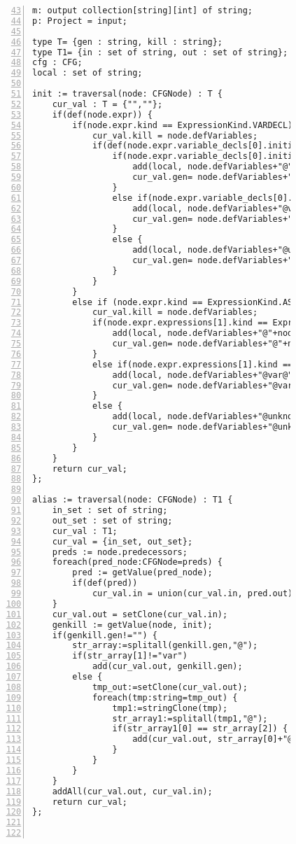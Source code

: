\begin{figure}[ht!]
\begin{lstlisting}[numbers=left, tabsize=4, caption={Local must not alias},label={lst:lmna-code}, firstline = 43, firstnumber = 43, lastline = 91] 
m: output collection[string][int] of string;
p: Project = input;

type T= {gen : string, kill : string};
type T1= {in : set of string, out : set of string};
cfg : CFG;
local : set of string;

init := traversal(node: CFGNode) : T {
	cur_val : T = {"",""};
	if(def(node.expr)) {
		if(node.expr.kind == ExpressionKind.VARDECL) {
			cur_val.kill = node.defVariables;
			if(def(node.expr.variable_decls[0].initializer)) {
				if(node.expr.variable_decls[0].initializer.kind == ExpressionKind.NEW) {
					add(local, node.defVariables+"@"+node.expr.variable_decls[0].initializer.new_type.qualified_name);
					cur_val.gen= node.defVariables+"@"+node.expr.variable_decls[0].initializer.new_type.qualified_name;
				}
				else if(node.expr.variable_decls[0].initializer.kind == ExpressionKind.VARACCESS) {
					add(local, node.defVariables+"@var@"+node.expr.variable_decls[0].initializer.variable);
					cur_val.gen= node.defVariables+"@var@"+node.expr.variable_decls[0].initializer.variable;
				}
				else {
					add(local, node.defVariables+"@unknown");
					cur_val.gen= node.defVariables+"@unknown";
				}
			}
		}
		else if (node.expr.kind == ExpressionKind.ASSIGN) {
			cur_val.kill = node.defVariables;
			if(node.expr.expressions[1].kind == ExpressionKind.NEW) {
				add(local, node.defVariables+"@"+node.expr.expressions[1].new_type.qualified_name);
				cur_val.gen= node.defVariables+"@"+node.expr.expressions[1].new_type.qualified_name;
			}
			else if(node.expr.expressions[1].kind == ExpressionKind.VARACCESS) {
				add(local, node.defVariables+"@var@"+node.expr.expressions[1].variable);
				cur_val.gen= node.defVariables+"@var@"+node.expr.expressions[1].variable;
			}
			else {
				add(local, node.defVariables+"@unknown");
				cur_val.gen= node.defVariables+"@unknown";
			}
		}
	}
	return cur_val;
};

alias := traversal(node: CFGNode) : T1 {
	in_set : set of string;
	out_set : set of string;
	cur_val : T1;
	cur_val = {in_set, out_set};
	preds := node.predecessors;
	foreach(pred_node:CFGNode=preds) {	
		pred := getValue(pred_node);
		if(def(pred))
			cur_val.in = union(cur_val.in, pred.out);
	}
	cur_val.out = setClone(cur_val.in);
	genkill := getValue(node, init);
	if(genkill.gen!="") {
		str_array:=splitall(genkill.gen,"@");
		if(str_array[1]!="var")
			add(cur_val.out, genkill.gen);
		else {
			tmp_out:=setClone(cur_val.out);
			foreach(tmp:string=tmp_out) {
				tmp1:=stringClone(tmp);
				str_array1:=splitall(tmp1,"@");
				if(str_array1[0] == str_array[2]) {
					add(cur_val.out, str_array[0]+"@"+str_array1[1]);
				}
			}
		}
	}
	addAll(cur_val.out, cur_val.in);
	return cur_val;
};



\end{lstlisting}
\end{figure}
